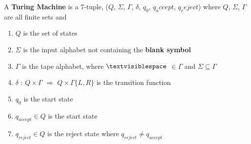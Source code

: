 \documentclass{article}
\begin{document}
A \textbf{Turing Machine} is a 7-tuple, ($Q$, $\Sigma$, $\Gamma$, $\delta$, $q_0$, $q_accept$, $q_reject$) where $Q$, $\Sigma$, $\Gamma$ are all finite sets and

\begin{enumerate}
    \item $Q$ is the set of states
    \item $\Sigma$ is the input alphabet not containing the \textbf{blank symbol} \textvisiblespace
    \item $\Gamma$ is the tape alphabet, where $\textvisiblespace$ $\in \Gamma$ and $\Sigma \subseteq \Gamma$
    \item $\delta$ : $Q \times \Gamma $ $\Longrightarrow$ $Q \times \Gamma \{L,R\}$ is the transition function
    \item $q_0$ is the start state
    \item $q_{accept} \in Q$ is the start state
    \item $q_{reject} \in Q$ is the reject state where $q_{reject} \neq q_{accept}$
    
\end{enumerate}
\end{document}
